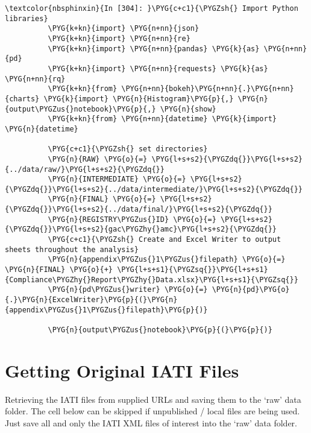 \documentclass[letterpaper,10pt,english]{sphinxmanual}
\begin{document}
\begin{Verbatim}[commandchars=\\\{\}]
\textcolor{nbsphinxin}{In [304]: }\PYG{c+c1}{\PYGZsh{} Import Python libraries}
          \PYG{k+kn}{import} \PYG{n+nn}{json}
          \PYG{k+kn}{import} \PYG{n+nn}{re}
          \PYG{k+kn}{import} \PYG{n+nn}{pandas} \PYG{k}{as} \PYG{n+nn}{pd}
          \PYG{k+kn}{import} \PYG{n+nn}{requests} \PYG{k}{as} \PYG{n+nn}{rq}
          \PYG{k+kn}{from} \PYG{n+nn}{bokeh}\PYG{n+nn}{.}\PYG{n+nn}{charts} \PYG{k}{import} \PYG{n}{Histogram}\PYG{p}{,} \PYG{n}{output\PYGZus{}notebook}\PYG{p}{,} \PYG{n}{show}
          \PYG{k+kn}{from} \PYG{n+nn}{datetime} \PYG{k}{import} \PYG{n}{datetime}
          
          \PYG{c+c1}{\PYGZsh{} set directories}
          \PYG{n}{RAW} \PYG{o}{=} \PYG{l+s+s2}{\PYGZdq{}}\PYG{l+s+s2}{../data/raw/}\PYG{l+s+s2}{\PYGZdq{}}
          \PYG{n}{INTERMEDIATE} \PYG{o}{=} \PYG{l+s+s2}{\PYGZdq{}}\PYG{l+s+s2}{../data/intermediate/}\PYG{l+s+s2}{\PYGZdq{}}
          \PYG{n}{FINAL} \PYG{o}{=} \PYG{l+s+s2}{\PYGZdq{}}\PYG{l+s+s2}{../data/final/}\PYG{l+s+s2}{\PYGZdq{}}
          \PYG{n}{REGISTRY\PYGZus{}ID} \PYG{o}{=} \PYG{l+s+s2}{\PYGZdq{}}\PYG{l+s+s2}{gac\PYGZhy{}amc}\PYG{l+s+s2}{\PYGZdq{}}
          \PYG{c+c1}{\PYGZsh{} Create and Excel Writer to output sheets throughout the analysis}
          \PYG{n}{appendix\PYGZus{}1\PYGZus{}filepath} \PYG{o}{=} \PYG{n}{FINAL} \PYG{o}{+} \PYG{l+s+s1}{\PYGZsq{}}\PYG{l+s+s1}{Compliance\PYGZhy{}Report\PYGZhy{}Data.xlsx}\PYG{l+s+s1}{\PYGZsq{}}
          \PYG{n}{pd\PYGZus{}writer} \PYG{o}{=} \PYG{n}{pd}\PYG{o}{.}\PYG{n}{ExcelWriter}\PYG{p}{(}\PYG{n}{appendix\PYGZus{}1\PYGZus{}filepath}\PYG{p}{)}
          
          \PYG{n}{output\PYGZus{}notebook}\PYG{p}{(}\PYG{p}{)}
\end{Verbatim}


\section{Getting Original IATI Files}
\label{\detokenize{Global Affairs Canada - Compliance Report:Getting-Original-IATI-Files}}
Retrieving the IATI files from supplied URLs and saving them to the
`raw' data folder. The cell below can be skipped if unpublished / local
files are being used. Just save all and only the IATI XML files of
interest into the `raw' data folder.
\end{document}
